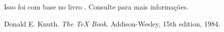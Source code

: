 \documentclass[a4paper,11pt]{article}
\begin{document}
Isso foi com base no livro \cite{knuth}.  Consulte  para mais informações.
\begin{thebibliography}{4}
	
	
	Donald E. Knuth.
	\textit{The \TeX{} Book}.
	Addison-Wesley, 15th edition, 1984.
\end{thebibliography}
\end{document}
